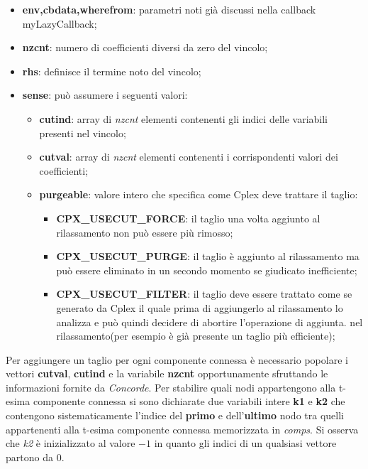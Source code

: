 \documentclass[11pt]{article}
\begin{document}
\begin{itemize}
    \item \textbf{env,cbdata,wherefrom}: parametri noti già discussi nella callback myLazyCallback;
    \item \textbf{nzcnt}: numero di coefficienti diversi da zero del vincolo;
    \item \textbf{rhs}: definisce il termine noto del vincolo;
    \item \textbf{sense}: può assumere i seguenti valori:
    
    \begin{itemize}
    \item \textbf{cutind}: array di \textit{nzcnt} elementi contenenti gli indici delle variabili presenti nel vincolo;
    \item \textbf{cutval}: array di \textit{nzcnt} elementi contenenti i corrispondenti valori dei coefficienti;
    \item \textbf{purgeable}: valore intero che specifica come Cplex deve trattare il taglio:
    
        \begin{itemize}
        \item \textbf{CPX\_USECUT\_FORCE}: il taglio una volta aggiunto al rilassamento non può essere più rimosso;
        \item \textbf{CPX\_USECUT\_PURGE}: il taglio è aggiunto al rilassamento ma può essere eliminato in un secondo momento se giudicato inefficiente;
        \item \textbf{CPX\_USECUT\_FILTER}: il taglio deve essere trattato come se generato da Cplex il quale prima di aggiungerlo al rilassamento lo analizza e può quindi decidere di abortire l'operazione di aggiunta.
        nel rilassamento(per esempio è già presente un taglio più efficiente);
        \end{itemize}
    \end{itemize}
\end{itemize}

Per aggiungere un taglio per ogni componente connessa è necessario popolare i vettori \textbf{cutval}, \textbf{cutind} e la variabile \textbf{nzcnt} opportunamente sfruttando le informazioni fornite da \textit{Concorde}. Per stabilire quali nodi appartengono alla t-esima componente connessa si sono dichiarate due variabili intere \textbf{k1} e \textbf{k2} che contengono sistematicamente l'indice del \textbf{primo} e dell'\textbf{ultimo} nodo tra quelli appartenenti alla t-esima componente connessa memorizzata in \textit{comps}. Si osserva che \textit{k2} è inizializzato al valore \textbf{$-1$} in quanto gli indici di un qualsiasi vettore partono da $0$.
\end{document}
